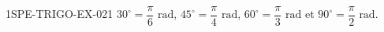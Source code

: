 \begin{corrige}{1SPE-TRIGO-EX-021}
$30^\circ = \dfrac{\pi}{6}\text{ rad}$, $45^\circ = \dfrac{\pi}{4}\text{ rad}$, $60^\circ = \dfrac{\pi}{3}\text{ rad}$ et $90^\circ = \dfrac{\pi}{2}\text{ rad}$.
\end{corrige}

%
%
